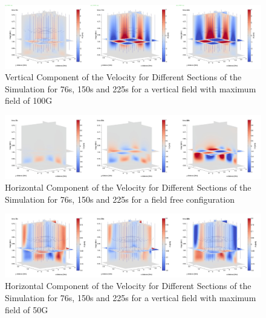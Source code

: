 \documentclass{aastex62}
\begin{document}
\begin{figure}[h]\label{vzplot_bv100g_76_150_225}
\includegraphics[scale=0.15]{imrescale/vz_bv100g_76_150_225.jpg}
\caption{Vertical Component of the Velocity for Different Sections of the Simulation for 76s, 150s and 225s for a vertical field with maximum field of 100G}
\end{figure}

\begin{figure}[h]\label{vxplot_bv0g_76_150_225}
\includegraphics[scale=0.15]{imrescale/vx_bv0g_76_150_225.jpg}
\caption{Horizontal Component of the Velocity for Different Sections of the Simulation for 76s, 150s and 225s for a field free configuration}
\end{figure}

\begin{figure}[h]\label{vxplot_bv50g_76_150_225}
\includegraphics[scale=0.15]{imrescale/vx_bv50g_76_150_225.jpg}
\caption{Horizontal Component of the Velocity for Different Sections of the Simulation for 76s, 150s and 225s for a vertical field with maximum field of 50G}
\end{figure}
\end{document}
